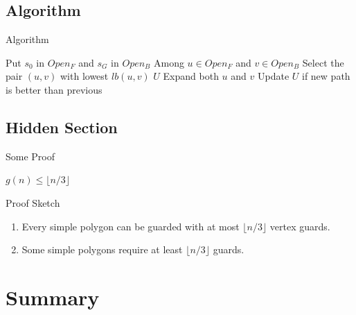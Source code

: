 \documentclass[xcolor=dvipsnames]{beamer} %
\begin{document}
\subsection{Algorithm}
\begin{frame}{Algorithm}
\begin{algorithm}[H]
\begin{algorithmic}[1]
\caption{Algorithm Title}
\State Put $s_0$ in $Open_F$ and $s_G$ in $Open_B$
    \State Among $u \in Open_F$ and $v \in Open_B$
    \State Select the pair $(u,v)$ with lowest $lb(u,v)$
        \State \Return $U$
    \EndIf
    \State Expand both $u$ and $v$
        \State Update $U$ if new path is better than previous
    \EndIf
\EndWhile
\end{algorithmic}
\end{algorithm}
\end{frame}


\subsection*{Hidden Section}%
\begin{frame}{Some Proof}
  \begin{theorem}
      $g(n) \leq \lfloor n/3\rfloor$
  \end{theorem}
  \begin{block}{Proof Sketch}
      \begin{enumerate}
      \item Every simple polygon can be guarded 
            with at most $\lfloor n/3\rfloor$ vertex guards.
      \item Some simple polygons require at least $\lfloor n/3\rfloor$ guards.
      \end{enumerate}
  \end{block}
\end{frame}

\section*{Summary}
\end{document}
